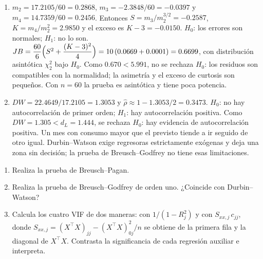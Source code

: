 \begin{solucion}
\begin{enumerate}
  \item $m_2=17.2105/60=0.2868$, $m_3=-2.3848/60=-0.0397$ y $m_4=14.7359/60=0.2456$. Entonces $S=m_3/m_2^{3/2}=-0.2587$, $K=m_4/m_2^2=2.9850$ y el exceso es $K-3=-0.0150$. $H_0$: los errores son normales; $H_1$: no lo son. $JB=\dfrac{60}{6}\Bigl(S^2+\dfrac{(K-3)^2}{4}\Bigr)=10\,(0.0669+0.0001)=0.6699$, con distribución asintótica $\chi^2_2$ bajo $H_0$. Como $0.670<5.991$, no se rechaza $H_0$: los residuos son compatibles con la normalidad; la asimetría y el exceso de curtosis son pequeños. Con $n=60$ la prueba es asintótica y tiene poca potencia.
  \item $DW=22.4649/17.2105=1.3053$ y $\hat\rho\approx1-1.3053/2=0.3473$. $H_0$: no hay autocorrelación de primer orden; $H_1$: hay autocorrelación positiva. Como $DW=1.305<d_L=1.444$, se rechaza $H_0$: hay evidencia de autocorrelación positiva. Un mes con consumo mayor que el previsto tiende a ir seguido de otro igual. Durbin--Watson exige regresoras estrictamente exógenas y deja una zona sin decisión; la prueba de Breusch--Godfrey no tiene esas limitaciones.
\end{enumerate}
\end{solucion}

\begin{enumerate}
  \item Realiza la prueba de Breusch--Pagan.
  \item Realiza la prueba de Breusch--Godfrey de orden uno. ¿Coincide con Durbin--Watson?
  \item Calcula los cuatro VIF de dos maneras: con $1/(1-R_j^2)$ y con $S_{xx,j}\,c_{jj}$, donde $S_{xx,j}=(X^\top X)_{jj}-(X^\top X)_{0j}^2/n$ se obtiene de la primera fila y la diagonal de $X^\top X$. Contrasta la significancia de cada regresión auxiliar e interpreta.
\end{enumerate}

